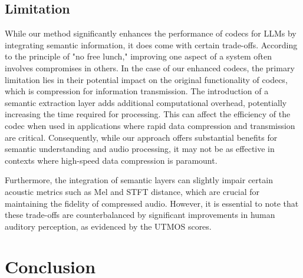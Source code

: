 \subsection{Limitation}
 
While our method significantly enhances the performance of codecs for LLMs by integrating semantic information, it does come with certain trade-offs. According to the principle of "no free lunch," improving one aspect of a system often involves compromises in others. In the case of our enhanced codecs, the primary limitation lies in their potential impact on the original functionality of codecs, which is compression for information transmission. The introduction of a semantic extraction layer adds additional computational overhead, potentially increasing the time required for processing. This can affect the efficiency of the codec when used in applications where rapid data compression and transmission are critical. Consequently, while our approach offers substantial benefits for semantic understanding and audio processing, it may not be as effective in contexts where high-speed data compression is paramount.
\begin{table}[h!]
\centering
{}
\caption{Comparison of reconstruction based on Mel DT., STFT DT., and UTMOS metrics using 1000 LibriTTS speech samples. “DT.” is short for distance}
\end{table}

Furthermore, the integration of semantic layers can slightly impair certain acoustic metrics such as Mel and STFT distance, which are crucial for maintaining the fidelity of compressed audio. However, it is essential to note that these trade-offs are counterbalanced by significant improvements in human auditory perception, as evidenced by the UTMOS scores.

 
 
 
 
\section{Conclusion}

